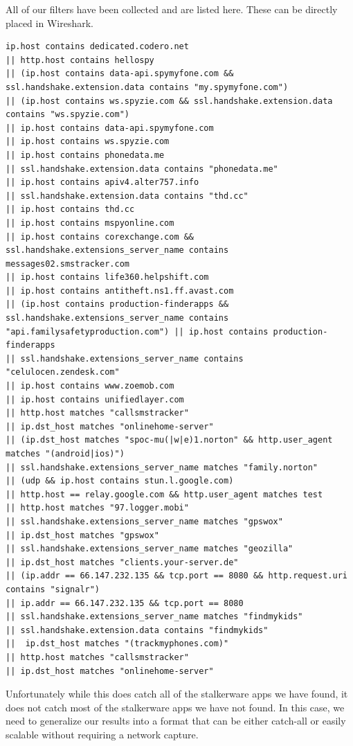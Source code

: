 \documentclass[acmtog]{acmart}
\begin{document}
All of our filters have been collected and are listed here. These can be directly placed in Wireshark. 
\begin{lstlisting}
ip.host contains dedicated.codero.net 
|| http.host contains hellospy
|| (ip.host contains data-api.spymyfone.com && ssl.handshake.extension.data contains "my.spymyfone.com") 
|| (ip.host contains ws.spyzie.com && ssl.handshake.extension.data contains "ws.spyzie.com") 
|| ip.host contains data-api.spymyfone.com 
|| ip.host contains ws.spyzie.com 
|| ip.host contains phonedata.me 
|| ssl.handshake.extension.data contains "phonedata.me" 
|| ip.host contains apiv4.alter757.info 
|| ssl.handshake.extension.data contains "thd.cc" 
|| ip.host contains thd.cc 
|| ip.host contains mspyonline.com 
|| ip.host contains corexchange.com && ssl.handshake.extensions_server_name contains messages02.smstracker.com 
|| ip.host contains life360.helpshift.com 
|| ip.host contains antitheft.ns1.ff.avast.com 
|| (ip.host contains production-finderapps && ssl.handshake.extensions_server_name contains "api.familysafetyproduction.com") || ip.host contains production-finderapps 
|| ssl.handshake.extensions_server_name contains "celulocen.zendesk.com" 
|| ip.host contains www.zoemob.com 
|| ip.host contains unifiedlayer.com 
|| http.host matches "callsmstracker" 
|| ip.dst_host matches "onlinehome-server" 
|| (ip.dst_host matches "spoc-mu(|w|e)1.norton" && http.user_agent matches "(android|ios)")
|| ssl.handshake.extensions_server_name matches "family.norton" 
|| (udp && ip.host contains stun.l.google.com) 
|| http.host == relay.google.com && http.user_agent matches test 
|| http.host matches "97.logger.mobi" 
|| ssl.handshake.extensions_server_name matches "gpswox" 
|| ip.dst_host matches "gpswox" 
|| ssl.handshake.extensions_server_name matches "geozilla" 
|| ip.dst_host matches "clients.your-server.de" 
|| (ip.addr == 66.147.232.135 && tcp.port == 8080 && http.request.uri contains "signalr") 
|| ip.addr == 66.147.232.135 && tcp.port == 8080 
|| ssl.handshake.extensions_server_name matches "findmykids" 
|| ssl.handshake.extension.data contains "findmykids"  
||  ip.dst_host matches "(trackmyphones.com)" 
|| http.host matches "callsmstracker" 
|| ip.dst_host matches "onlinehome-server" 
 \end{lstlisting}
 
 Unfortunately while this does catch all of the stalkerware apps we have found, it does not catch most of the stalkerware apps we have not found. In this case, we need to generalize our results into a format that can be either catch-all or easily scalable without requiring a network capture.
\end{document}
